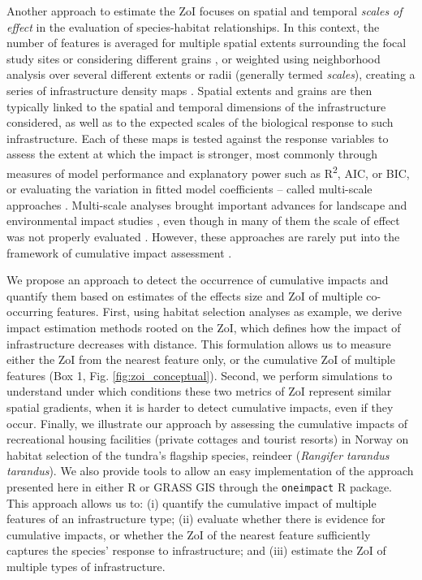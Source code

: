 \documentclass[titlepage]{article}
\begin{document}
Another approach to estimate the ZoI focuses on spatial and temporal \textit{scales of effect} in the evaluation of species-habitat relationships. In this context, the number of features is averaged for multiple spatial extents surrounding the focal study sites \citep{jackson_are_2015} or considering different grains \citep{laforge_process-focussed_2015}, or weighted using neighborhood analysis over several different extents or radii (generally termed \textit{scales}), creating a series of infrastructure density maps \citep{mcgarigal_multi-scale_2016}. Spatial extents and grains are then typically linked to the spatial and temporal dimensions of the infrastructure considered, as well as to the expected scales of the biological response to such infrastructure. Each of these maps is tested against the response variables to assess the extent at which the impact is stronger, most commonly through measures of model performance and explanatory power such as R\textsuperscript{2}, AIC, or BIC, or evaluating the variation in fitted model coefficients \citep{jackson_are_2015, huais_multifit_2018} -- called multi-scale approaches \citep[e.g.][]{zeller_multi-level_2017}.
Multi-scale analyses brought important advances for landscape and environmental impact studies \citep[e.g.][]{mcgarigal_multi-scale_2016}, even though in many of them the scale of effect was not properly evaluated \citep{jackson_are_2015}. However, these approaches are rarely put into the framework of cumulative impact assessment \citep[but see][]{polfus_identifying_2011}.

We propose an approach to detect the occurrence of cumulative impacts and quantify them based on estimates of the effects size and ZoI of multiple co-occurring features. First, using habitat selection analyses as example, we derive impact estimation methods rooted on the ZoI, which defines how the impact of infrastructure decreases with distance. This formulation allows us to measure either the ZoI from the nearest feature only, or the cumulative ZoI of multiple features (Box 1, Fig. \ref{fig:zoi_conceptual}). Second, we perform simulations to understand under which conditions these two metrics of ZoI represent similar spatial gradients, when it is harder to detect cumulative impacts, even if they occur. 
Finally, we illustrate our approach by assessing the cumulative impacts of recreational housing facilities (private cottages and tourist resorts) in Norway on habitat selection of the tundra's flagship species, reindeer (\textit{Rangifer tarandus tarandus}). We also provide tools to allow an easy implementation of the approach presented here in either R \citep{r_core_team_r_2020} or GRASS GIS \citep{grass_development_team_geographic_2017} through the \verb|oneimpact| R package. This approach allows us to: (i) quantify the cumulative impact of multiple features of an infrastructure type; (ii) evaluate whether there is evidence for cumulative impacts, or whether the ZoI of the nearest feature sufficiently captures the species' response to infrastructure; and (iii) estimate the ZoI of multiple types of infrastructure. 
\end{document}
